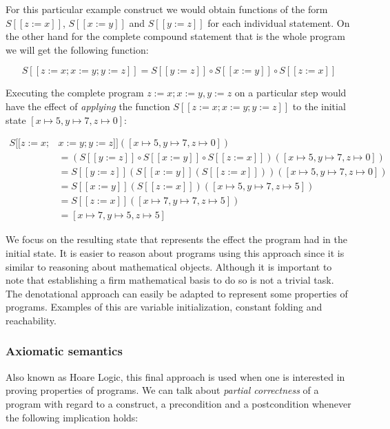 For this particular example construct we would obtain functions of the form $S [\![ z:=x ]\!]$, $S [\![ x:=y ]\!]$ and $S [\![ y:=z ]\!]$ for each individual statement.
On the other hand for the complete compound statement that is the whole program we will get the following function:

\begin{equation*}
S [\![ z:=x; x:=y; y:=z ]\!] = S [\![ y:=z ]\!] \circ S [\![ x:=y ]\!] \circ S [\![ z:=x ]\!]
\end{equation*}

Executing the complete program $z:=x; x:=y, y:=z$ on a particular step would have the effect of \textit{applying} the function $S [\![ z:=x; x:=y; y:=z ]\!]$ to the initial state $[x\mapsto5, y\mapsto7, z\mapsto0]$:

\begin{align*}
S [\![ z:=x; & x:=y; y:=z ]\!]([x\mapsto5, y\mapsto7, z\mapsto0])\\
&= (S [\![ y:=z ]\!] \circ S [\![ x:=y ]\!] \circ S [\![ z:=x ]\!])([x\mapsto5, y\mapsto7, z\mapsto0])\\
&= S [\![ y:=z ]\!](S [\![ x:=y ]\!] (S [\![ z:=x ]\!]))([x\mapsto5, y\mapsto7, z\mapsto0])\\
&= S [\![ x:=y ]\!] (S [\![ z:=x ]\!])([x\mapsto5, y\mapsto7, z\mapsto5])\\
&= S [\![ z:=x ]\!]([x\mapsto7, y\mapsto7, z\mapsto5])\\
&= [x\mapsto7, y\mapsto5, z\mapsto5]
\end{align*}

We focus on the resulting state that represents the effect the program had in the initial state.
It is easier to reason about programs using this approach since it is similar to reasoning about mathematical objects.
Although it is important to note that establishing a firm mathematical basis to do so is not a trivial task.
The denotational approach can easily be adapted to represent some properties of programs.
Examples of this are variable initialization, constant folding and reachability.~\parencite{nielson}


\subsubsection{Axiomatic semantics}

Also known as Hoare Logic, this final approach is used when one is interested in proving properties of programs.
We can talk about \textit{partial correctness} of a program with regard to a construct, a precondition and a postcondition whenever the following implication holds:

